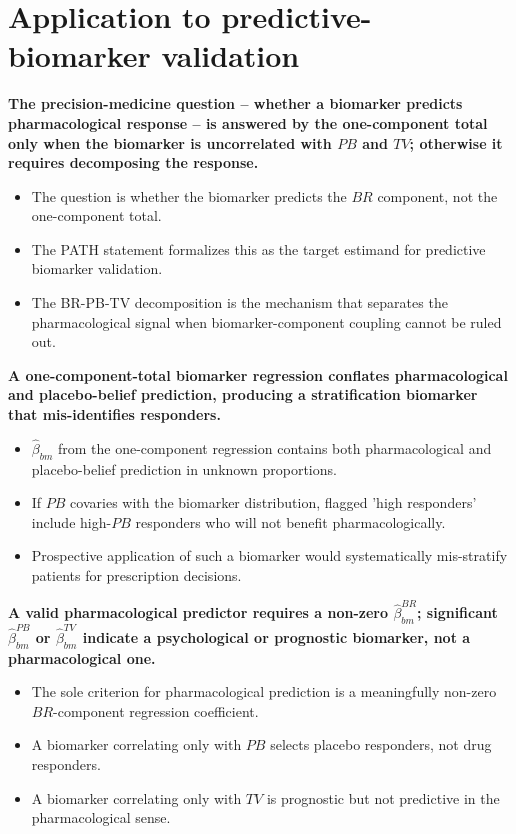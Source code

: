 \documentclass[
  11pt,
]{article}
\begin{document}
\section{Application to predictive-biomarker validation}\label{application-to-predictive-biomarker-validation}

\textbf{The precision-medicine question -- whether a biomarker predicts pharmacological response -- is answered by the one-component total only when the biomarker is uncorrelated with $PB$ and $TV$; otherwise it requires decomposing the response.}

\begin{itemize}\setlength{\itemsep}{2pt}\setlength{\parskip}{0pt}
\item The question is whether the biomarker predicts the $BR$ component, not the one-component total.
\item The PATH statement formalizes this as the target estimand for predictive biomarker validation.
\item The BR-PB-TV decomposition is the mechanism that separates the pharmacological signal when biomarker-component coupling cannot be ruled out.
\end{itemize}

\textbf{A one-component-total biomarker regression conflates pharmacological and placebo-belief prediction, producing a stratification biomarker that mis-identifies responders.}

\begin{itemize}\setlength{\itemsep}{2pt}\setlength{\parskip}{0pt}
\item $\hat\beta_{bm}$ from the one-component regression contains both pharmacological and placebo-belief prediction in unknown proportions.
\item If $PB$ covaries with the biomarker distribution, flagged 'high responders' include high-$PB$ responders who will not benefit pharmacologically.
\item Prospective application of such a biomarker would systematically mis-stratify patients for prescription decisions.
\end{itemize}

\textbf{A valid pharmacological predictor requires a non-zero $\hat\beta_{bm}^{BR}$; significant $\hat\beta_{bm}^{PB}$ or $\hat\beta_{bm}^{TV}$ indicate a psychological or prognostic biomarker, not a pharmacological one.}

\begin{itemize}\setlength{\itemsep}{2pt}\setlength{\parskip}{0pt}
\item The sole criterion for pharmacological prediction is a meaningfully non-zero $BR$-component regression coefficient.
\item A biomarker correlating only with $PB$ selects placebo responders, not drug responders.
\item A biomarker correlating only with $TV$ is prognostic but not predictive in the pharmacological sense.
\end{itemize}
\end{document}
